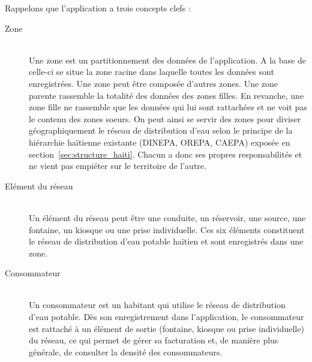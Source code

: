 \documentclass{EPL-master-thesis-covers-FR}
\begin{document}

				Rappelons que l'application a trois concepts clefs :
				\begin{description}
					\item[Zone] \hfill \\
						Une zone est un partitionnement des données de l'application. A la base de celle-ci se situe la zone racine dans laquelle toutes les données sont enregistrées. Une zone peut être composée d'autres zones. Une zone parente rassemble la totalité des données des zones filles. En revanche, une zone fille ne rassemble que les données qui lui sont rattachées et ne voit pas le contenu des zones soeurs. On peut ainsi se servir des zones pour diviser géographiquement le réseau de distribution d'eau selon le principe de la hiérarchie haïtienne existante (DINEPA, OREPA, CAEPA) exposée en section~\ref{sec:structure_haiti}. Chacun a donc ses propres responsabilités et ne vient pas empiéter sur le territoire de l'autre.
					\item[Elément du réseau] \hfill \\
						Un élément du réseau peut être une conduite, un réservoir, une source, une fontaine, un kiosque ou une prise individuelle. Ces six éléments constituent le réseau de distribution d'eau potable haïtien et sont enregistrés dans une zone.
					\item[Consommateur] \hfill \\
						Un consommateur est un habitant qui utilise le réseau de distribution d'eau potable. Dès son enregistrement dans l'application, le consommateur est rattaché à un élément de sortie (fontaine, kiosque ou prise individuelle) du réseau, ce qui permet de gérer sa facturation et, de manière plus générale, de consulter la densité des consommateurs.
				\end{description}
\end{document}
